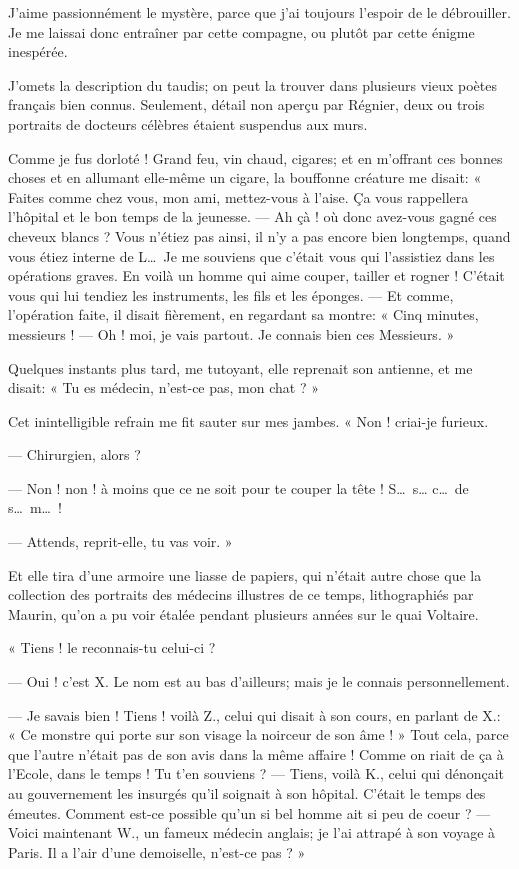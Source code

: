 J’aime passionnément le mystère, parce que
j’ai toujours l’espoir de le
débrouiller. Je me laissai donc entraîner par cette compagne, ou plutôt
par cette énigme inespérée.

J’omets la description du taudis; on peut la trouver
dans plusieurs vieux poètes français bien connus. Seulement, détail non
aperçu par Régnier, deux ou trois portraits de docteurs célèbres
étaient suspendus aux murs.

Comme je fus dorloté ! Grand feu, vin chaud, cigares; et en
m’offrant ces bonnes choses et en allumant elle{}-même
un cigare, la bouffonne créature me disait: « Faites comme chez vous,
mon ami, mettez{}-vous à l’aise. Ça vous rappellera
l’hôpital et le bon temps de la jeunesse. --- Ah çà ! où
donc avez{}-vous gagné ces cheveux blancs ? Vous
n’étiez pas ainsi, il n’y a pas
encore bien longtemps, quand vous étiez interne de L\ldots\ Je me souviens
que c’était vous qui l’assistiez dans
les opérations graves. En voilà un homme qui aime couper, tailler et
rogner ! C’était vous qui lui tendiez les instruments,
les fils et les éponges. --- Et comme, l’opération
faite, il disait fièrement, en regardant sa montre: « Cinq minutes,
messieurs ! --- Oh ! moi, je vais partout. Je connais bien ces Messieurs.
»

Quelques instants plus tard, me tutoyant, elle reprenait son antienne,
et me disait: « Tu es médecin, n’est{}-ce pas, mon
chat ? »

Cet inintelligible refrain me fit sauter sur mes jambes. « Non !
criai{}-je furieux.

--- Chirurgien, alors ?

--- Non ! non ! à moins que ce ne soit pour te couper la tête ! S\ldots\ s\ldots
c\ldots\ de s\ldots\ m\ldots\ !

--- Attends, reprit{}-elle, tu vas voir. »

Et elle tira d’une armoire une liasse de papiers, qui
n’était autre chose que la collection des portraits
des médecins illustres de ce temps, lithographiés par Maurin,
qu’on a pu voir étalée pendant plusieurs années sur le
quai Voltaire.

« Tiens ! le reconnais{}-tu celui{}-ci ?

--- Oui ! c’est X. Le nom est au bas
d’ailleurs; mais je le connais personnellement.

--- Je savais bien ! Tiens ! voilà Z., celui qui disait à son cours, en
parlant de X.: « Ce monstre qui porte sur son visage la noirceur de son
âme ! » Tout cela, parce que l’autre
n’était pas de son avis dans la même affaire ! Comme
on riait de ça à l’Ecole, dans le temps ! Tu
t’en souviens ? --- Tiens, voilà K., celui qui dénonçait
au gouvernement les insurgés qu’il soignait à son
hôpital. C’était le temps des émeutes. Comment
est{}-ce possible qu’un si bel homme ait si peu de
coeur ? --- Voici maintenant W., un fameux médecin anglais; je
l’ai attrapé à son voyage à Paris. Il a
l’air d’une demoiselle,
n’est{}-ce pas ? »

